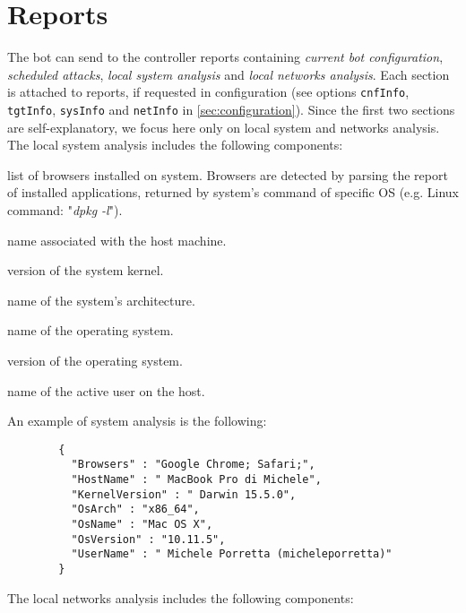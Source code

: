 \section{Reports}
\label{sec:reports}

The bot can send to the controller reports containing \textit{current bot configuration}, \textit{scheduled attacks}, \textit{local system analysis} and \textit{local networks analysis}. Each section is attached to reports, if requested in configuration (see options \texttt{cnfInfo}, \texttt{tgtInfo}, \texttt{sysInfo} and \texttt{netInfo} in \ref{sec:configuration}). Since the first two sections are self-explanatory, we focus here only on local system and networks analysis.\\

The local system analysis includes the following components:
\begin{description}
  \setlength\itemsep{1em}
    \item [browsers] list of browsers installed on system. Browsers are detected by parsing the report of installed applications, returned by system's command of specific OS (e.g. Linux command: "\textit{dpkg -l}").
	\item [hostName] name associated with the host machine.
	\item [kernelVersion] version of the system kernel.
	\item [osArch] name of the system's architecture.
  	\item [osName] name of the operating system.
  	\item [osVersion] version of the operating system.
  	\item [userName] name of the active user on the host.
\end{description}
\;

An example of system analysis is the following:
\begin{description}
	\item 
		\begin{verbatim}
		{
		  "Browsers" : "Google Chrome; Safari;",
		  "HostName" : " MacBook Pro di Michele",
	 	  "KernelVersion" : " Darwin 15.5.0",
	 	  "OsArch" : "x86_64",
		  "OsName" : "Mac OS X",
		  "OsVersion" : "10.11.5",
		  "UserName" : " Michele Porretta (micheleporretta)"
		}
		\end{verbatim}
\end{description}

The local networks analysis includes the following components:

